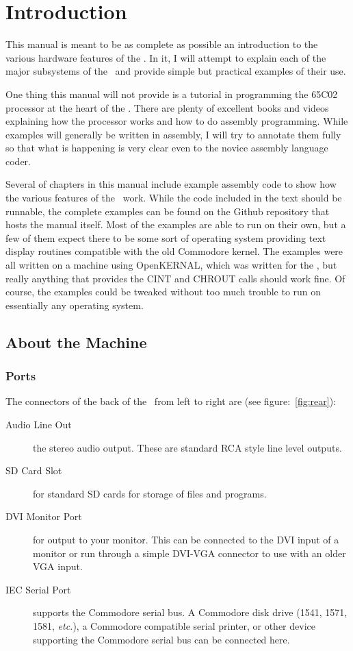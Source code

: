 \chapter{Introduction}

This manual is meant to be as complete as possible an introduction to the various hardware features of the \jr. In it, I will attempt to explain each of the major subsystems of the \jr\ and provide simple but practical examples of their use.

One thing this manual will not provide is a tutorial in programming the 65C02 processor at the heart of the \jr. There are plenty of excellent books and videos explaining how the processor works and how to do assembly programming. While examples will generally be written in assembly, I will try to annotate them fully so that what is happening is very clear even to the novice assembly language coder.

Several of chapters in this manual include example assembly code to show how the various features of the \jr\ work. While the code included in the text should be runnable, the complete examples can be found on the Github repository that hosts the manual itself. Most of the examples are able to run on their own, but a few of them expect there to be some sort of operating system providing text display routines compatible with the old Commodore kernel. The examples were all written on a machine using OpenKERNAL, which was written for the \jr, but really anything that provides the CINT and CHROUT calls should work fine. Of course, the examples could be tweaked without too much trouble to run on essentially any operating system.

\section*{About the Machine}

\subsection*{Ports}

The connectors of the back of the \jr\ from left to right are (see figure:~\ref{fig:rear}):

\begin{description}
    \item[Audio Line Out] the stereo audio output. These are standard RCA style line level outputs.

    \item[SD Card Slot] for standard SD cards for storage of files and programs.

    \item[DVI Monitor Port] for output to your monitor. This can be connected to the DVI input of a monitor or run through a simple DVI-VGA connector to use with an older VGA input.

    \item[IEC Serial Port] supports the Commodore serial bus. A Commodore disk drive (1541, 1571, 1581, {\it etc.}), a Commodore compatible serial printer, or other device supporting the Commodore serial bus can be connected here.
\end{description}

